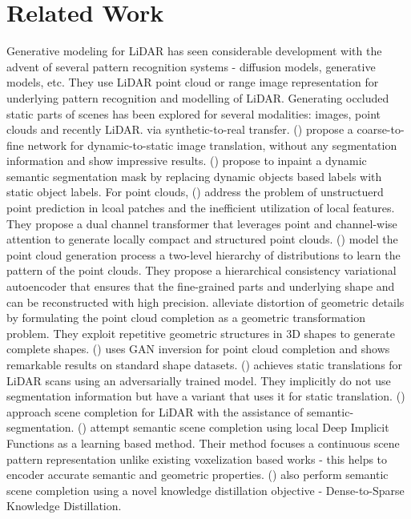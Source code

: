 \section{Related Work}
\label{related}
 Generative modeling for LiDAR has seen considerable development with the advent of several pattern recognition systems - diffusion models, generative models, etc. They use LiDAR point cloud or range image representation for underlying pattern recognition and modelling of LiDAR. Generating occluded static parts of scenes has been explored for several modalities: images, point clouds and recently LiDAR. 
 via synthetic-to-real transfer. 
 (\citet{wang2022coarse}) propose a coarse-to-fine network for dynamic-to-static image translation, without any segmentation information and show impressive results. 
 (\citet{ahn2023unsupervised}) propose to inpaint a dynamic semantic segmentation mask by replacing dynamic objects based labels with static object labels.
  For point clouds, (\citet{fei2023dctr}) address the problem of unstructuerd point prediction in lcoal patches and the inefficient utilization of local features. They propose a dual channel transformer that leverages point and channel-wise attention to generate locally compact and structured point clouds. (\citet{li2023progressive}) model the point cloud generation process a two-level hierarchy of distributions to learn the pattern of the point clouds. They propose a hierarchical consistency variational autoencoder that ensures that  the fine-grained parts and underlying shape and can be reconstructed with high precision. \citet{zhang2023learning} alleviate distortion of geometric details by formulating the  point cloud completion as a geometric transformation problem. They exploit repetitive geometric structures in 3D shapes to generate complete shapes.
  (\citet{zhang2021unsupervised}) uses GAN inversion for point cloud completion and shows remarkable results on standard shape datasets. (\citet{kumar2021dynamic}) achieves static translations for LiDAR scans using an adversarially trained model. They implicitly do not use segmentation information but have a variant that uses it for static translation. (\citet{yang2021semantic}) approach scene completion for LiDAR with the assistance of semantic-segmentation. (\citet{rist2021semantic}) attempt semantic scene completion using local Deep Implicit Functions as a learning based method. Their method focuses a continuous scene pattern representation unlike existing voxelization based works - this helps to encoder accurate semantic and geometric properties. (\citet{xia2023scpnet}) also perform semantic scene completion using a novel knowledge distillation objective - Dense-to-Sparse Knowledge Distillation.  

